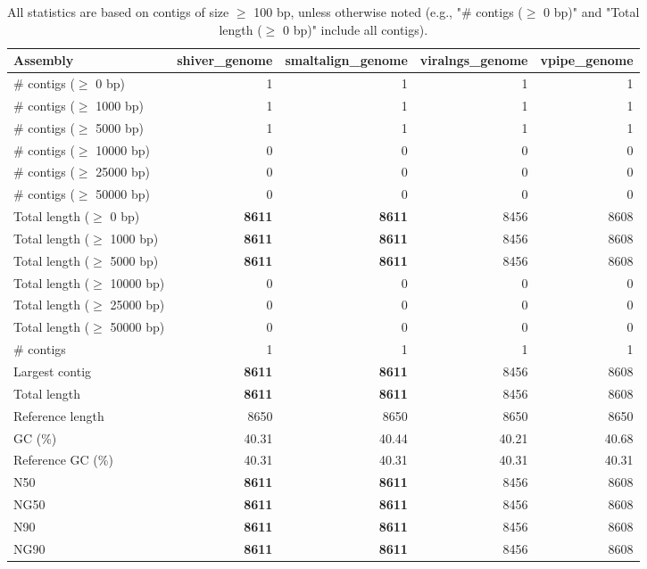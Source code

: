 \documentclass[12pt,a4paper]{article}
\begin{document}
\begin{table}[ht]
\begin{center}
\caption{All statistics are based on contigs of size $\geq$ 100 bp, unless otherwise noted (e.g., "\# contigs ($\geq$ 0 bp)" and "Total length ($\geq$ 0 bp)" include all contigs).}
\begin{tabular}{|l*{4}{|r}|}
\hline
Assembly & shiver\_genome & smaltalign\_genome & viralngs\_genome & vpipe\_genome \\ \hline
\# contigs ($\geq$ 0 bp) & 1 & 1 & 1 & 1 \\ \hline
\# contigs ($\geq$ 1000 bp) & 1 & 1 & 1 & 1 \\ \hline
\# contigs ($\geq$ 5000 bp) & 1 & 1 & 1 & 1 \\ \hline
\# contigs ($\geq$ 10000 bp) & 0 & 0 & 0 & 0 \\ \hline
\# contigs ($\geq$ 25000 bp) & 0 & 0 & 0 & 0 \\ \hline
\# contigs ($\geq$ 50000 bp) & 0 & 0 & 0 & 0 \\ \hline
Total length ($\geq$ 0 bp) & {\bf 8611} & {\bf 8611} & 8456 & 8608 \\ \hline
Total length ($\geq$ 1000 bp) & {\bf 8611} & {\bf 8611} & 8456 & 8608 \\ \hline
Total length ($\geq$ 5000 bp) & {\bf 8611} & {\bf 8611} & 8456 & 8608 \\ \hline
Total length ($\geq$ 10000 bp) & 0 & 0 & 0 & 0 \\ \hline
Total length ($\geq$ 25000 bp) & 0 & 0 & 0 & 0 \\ \hline
Total length ($\geq$ 50000 bp) & 0 & 0 & 0 & 0 \\ \hline
\# contigs & 1 & 1 & 1 & 1 \\ \hline
Largest contig & {\bf 8611} & {\bf 8611} & 8456 & 8608 \\ \hline
Total length & {\bf 8611} & {\bf 8611} & 8456 & 8608 \\ \hline
Reference length & 8650 & 8650 & 8650 & 8650 \\ \hline
GC (\%) & 40.31 & 40.44 & 40.21 & 40.68 \\ \hline
Reference GC (\%) & 40.31 & 40.31 & 40.31 & 40.31 \\ \hline
N50 & {\bf 8611} & {\bf 8611} & 8456 & 8608 \\ \hline
NG50 & {\bf 8611} & {\bf 8611} & 8456 & 8608 \\ \hline
N90 & {\bf 8611} & {\bf 8611} & 8456 & 8608 \\ \hline
NG90 & {\bf 8611} & {\bf 8611} & 8456 & 8608 \\ \hline

\end{tabular}
\end{center}
\end{table}
\end{document}
